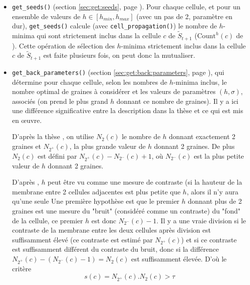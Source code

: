 \documentclass{article}
\begin{document}
\begin{itemize}
\begin{itemize}
\item \texttt{get\_seeds()} (section \ref{sec:get:seeds}, page \pageref{sec:get:seeds}). Pour chaque cellule, et pour un ensemble de valeurs de $h \in [h_{min}, h_{max}]$ (avec un pas de 2, param\`etre en dur), \texttt{get\_seeds()} calcule (avec \texttt{cell\_propagation()}) le nombre de  $h$-minima qui sont strictement inclus dans la cellule $c$ de $\tilde{S}_{t+1}$ ($\mathrm{Count}^{h}(c)$ de \cite[section 2.3.3.5, page 71]{guignard:tel-01278725}). Cette op\'eration de s\'election des $h$-minima strictement inclus dans la cellule  $c$ de $\tilde{S}_{t+1}$ est faite plusieurs fois, on peut donc la mutualiser.





\item \texttt{get\_back\_parameters()} (section \ref{sec:get:back:parameters}, page \pageref{sec:get:back:parameters}), qui d\'etermine pour chaque cellule, selon les nombres de $h$-minima inclus, le nombre optimal de graines \`a consid\'erer et les valeurs de param\`etres $(h, \sigma)$, associ\'es (on prend le plus grand $h$ donnant ce nombre de graines). Il y a ici une diff\'erence significative entre la description dans la th\`ese et ce qui est mis en {\oe}uvre.

D'apr\`es la th\`ese \cite[page 72]{guignard:tel-01278725}, on utilise $N_2(c)$ le nombre de $h$ donnant exactement 2 graines et $N_{2^{+}}(c)$, la plus grande valeur de $h$ donnant 2 graines. De plus $N_2(c)$ est d\'efini par $N_{2^{+}}(c) - N_{2^{-}}(c) +1$, o\`u $N_{2^{-}}(c)$ est la plus petite valeur de $h$ donnant 2 graines. 

D'apr\`es \cite{guignard:tel-01278725}, $h$ peut \^etre vu comme une mesure de contraste (si la hauteur de la membrane entre 2 cellules adjacentes est plus petite que $h$, alors il n'y aura qu'une seule 
Une premi\`ere hypoth\`ese est que le premier $h$ donnant plus de 2 graines est une mesure du "bruit" (consid\'er\'e comme un contraste) du "fond" de la cellule, ce premier $h$ est donc $N_{2^{-}}(c) - 1$. Il y a une vraie division si le contraste de la membrane entre les deux cellules apr\`es division est suffisamment \'elev\'e (ce contraste est estim\'e par $N_{2^{+}}(c)$) et si ce contraste est suffisamment diff\'erent du contraste du bruit, donc si la diff\'erence $N_{2^{+}}(c) - (N_{2^{-}}(c) - 1) = N_{2}(c)$ est suffisamment \'elev\'ee. D'o\`u le crit\`ere
\begin{equation}
s(c) = N_{2^{+}}(c) . N_{2}(c) > \tau
\end{equation}


\end{itemize}
\end{itemize}
\end{document}
